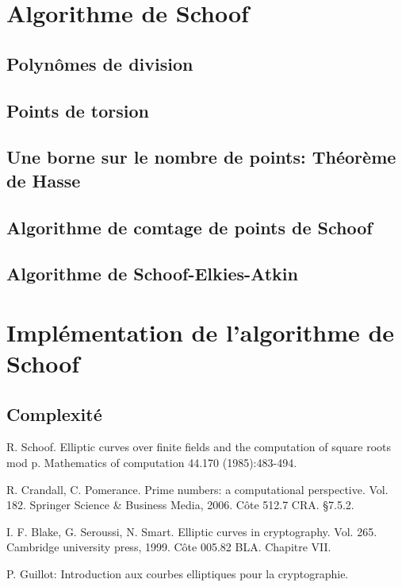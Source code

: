 \documentclass[letterpaper, 12pt]{article}
\begin{document}
\section{Algorithme de Schoof}
    \subsection{Polynômes de division}
    \subsection{Points de torsion}
    \subsection{Une borne sur le nombre de points: Théorème de Hasse}
    \subsection{Algorithme de comtage de points de Schoof}
    \subsection{Algorithme de Schoof-Elkies-Atkin}
    
\section{Implémentation de l'algorithme de Schoof}
    \subsection{Complexité}
    
\newpage
\newpage
\begin{thebibliography}{99}
\item R. Schoof. Elliptic curves over finite fields and the computation of square roots mod p. Mathematics of computation 44.170 (1985):483-494.

\item R. Crandall, C. Pomerance. Prime numbers: a computational perspective. Vol. 182. Springer Science & Business Media, 2006. Côte 512.7 CRA. §7.5.2.

\item I. F. Blake, G. Seroussi, N. Smart. Elliptic curves in cryptography. Vol. 265. Cambridge university press, 1999. Côte 005.82 BLA. Chapitre VII.

\item P. Guillot: Introduction aux courbes elliptiques pour la cryptographie.
\end{thebibliography}
\end{document}
